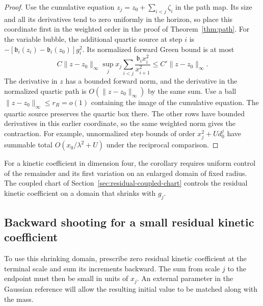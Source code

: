 \documentclass[11pt]{article}
\theoremstyle{definition}
\begin{document}
\begin{proof}
Use the cumulative equation \(z_j=z_0+\sum_{i<j}\zeta_i\)
in the path map. Its size and all its derivatives tend to zero
uniformly in the horizon, so place this coordinate first in
the weighted order in the proof of Theorem~\ref{thm:path}.
For the variable bubble, the additional quartic source at step
\(i\) is \(-[\mathfrak b_i(z_i)-\mathfrak b_i(z_0)]g_i^2\).
Its normalized forward Green bound is at most
\begin{equation}
 C\|z-z_0\|_\infty\sup_j x_j
                  \sum_{i<j}\frac{\mathfrak b_i x_i^2}{x_{i+1}^2}
 \le C'\|z-z_0\|_\infty .
\end{equation}
The derivative in \(z\) has a bounded forward norm, and the
derivative in the normalized quartic path is
\(O(\|z-z_0\|_\infty)\) by the same sum. Use a ball
\(\|z-z_0\|_\infty\le r_R=o(1)\) containing the image of the
cumulative equation. The quartic source preserves the quartic
box there. The other rows have bounded derivatives in this
earlier coordinate, so the same weighted norm gives the
contraction. For example, unnormalized step bounds of order
\(x_j^2+Ud_0^j\) have summable total
\(O(x_0/\lambda^2+U)\) under the reciprocal comparison.
\end{proof}

For a kinetic coefficient in dimension four, the corollary requires
uniform control of the remainder and its first variation on an
enlarged domain of fixed radius. The coupled chart of
Section~\ref{sec:residual-coupled-chart} controls the residual
kinetic coefficient on a domain that shrinks with \(g_j\).

\subsection{Backward shooting for a small residual kinetic coefficient}
\label{sec:backward-kinetic}

To use this shrinking domain, prescribe zero residual kinetic
coefficient at the terminal scale and sum its increments backward.
The sum from scale \(j\) to the endpoint must then be small in units
of \(x_j\). An external parameter in the Gaussian reference will
allow the resulting initial value to be matched along with the mass.
\end{document}
